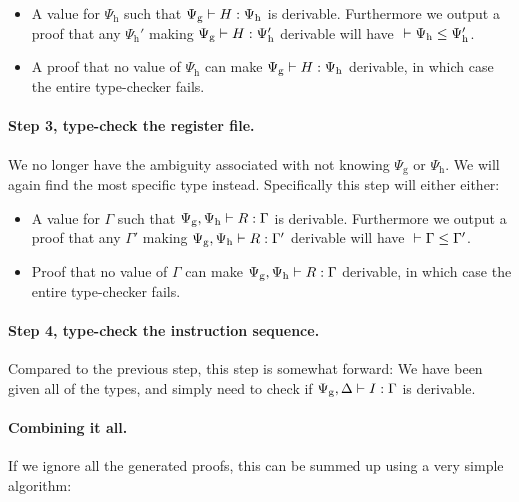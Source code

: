 \begin{itemize}
\item A value for $\Psi_{\mathrm{h}}$ such that
  ${\Psi_{\mathrm{g}}} |- {H} : {\Psi_{\mathrm{h}}}$ is derivable. Furthermore we
  output a proof that any $\Psi_{\mathrm{h}}'$ making
  ${\Psi_{\mathrm{g}}} |- {H} : {\Psi_{\mathrm{h}}'}$ derivable will have
  ${} |- {\Psi_{\mathrm{h}}} \le {\Psi_{\mathrm{h}}'}$.
\item A proof that no value of $\Psi_{\mathrm{h}}$ can make
  ${\Psi_{\mathrm{g}}} |- {H} : {\Psi_{\mathrm{h}}}$ derivable, in which
  case the entire type-checker fails.
\end{itemize}

\paragraph{Step 3, type-check the register file.} We no longer have the
ambiguity associated with not knowing $\Psi_{\mathrm{g}}$ or
$\Psi_{\mathrm{h}}$. We will again find the most specific type
instead. Specifically this step will either either:

\begin{itemize}
\item A value for $\Gamma$ such that
  ${\Psi_{\mathrm{g}},\Psi_{\mathrm{h}}} |- {R} : {\Gamma}$ is
  derivable. Furthermore we output a proof that any $\Gamma'$ making
  ${\Psi_{\mathrm{g}},\Psi_{\mathrm{h}}} |- {R} : {\Gamma'}$ derivable
  will have ${} |- {\Gamma} \le {\Gamma'}$.
\item Proof that no value of $\Gamma$ can make
  ${\Psi_{\mathrm{g}},\Psi_{\mathrm{h}}} |- {R} : {\Gamma}$ derivable,
  in which case the entire type-checker fails.
\end{itemize}

\paragraph{Step 4, type-check the instruction sequence.} Compared to the
previous step, this step is somewhat forward: We have been given all of the
types, and simply need to check if
${\Psi_{\mathrm{g}}, \Delta} |- {I} : {\Gamma}$ is derivable.

\paragraph{Combining it all.} If we ignore all the generated proofs, this can be
summed up using a very simple algorithm:

